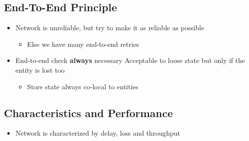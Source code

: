\subsection{End-To-End Principle}
\begin{itemize}
    \item Network is unreliable, but try to make it as reliable as possible
        \begin{itemize}
            \item Else we have many end-to-end retries
        \end{itemize}
    \item End-to-end check \textbf{always} necessary 
     Acceptable to loose state but only if the entity is lost too
        \begin{itemize}
            \item Store state always co-local to entities
        \end{itemize}
\end{itemize}

\subsection{Characteristics and Performance}
\begin{itemize}
    \item Network is characterized by delay, loss and throughput
\end{itemize}


